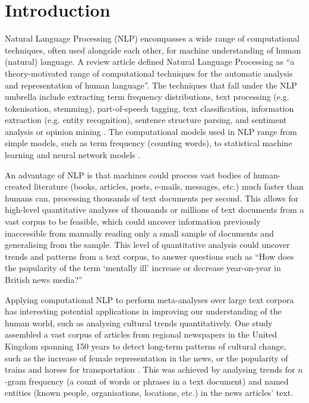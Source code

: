 \documentclass{report}
\begin{document}
\chapter{Introduction} \label{Introduction} %


Natural Language Processing (NLP) encompasses a wide range of computational techniques, often used alongside each other, for machine understanding of human (natural) language.
A review article \cite{cambria2014jumping} defined Natural Language Processing as ``a theory-motivated range of computational techniques for the automatic analysis and representation of human language''.
The techniques that fall under the NLP umbrella include extracting term frequency distributions, text processing (e.g. tokenisation, stemming), part-of-speech tagging, text classification, information extraction (e.g. entity recognition), sentence structure parsing, and sentiment analysis or opinion mining \cite{Nltk, liu2012sentiment}.
The computational models used in NLP range from simple models, such as term frequency (counting words), to statistical machine learning and neural network models \cite{awesome-sentiment-analysis}. 

An advantage of NLP is that machines could process vast bodies of human-created literature (books, articles, posts, e-mails, messages, etc.) much faster than humans can, processing thousands of text documents per second. 
This allows for high-level quantitative analyses of thousands or millions of text documents from a vast corpus to be feasible, which could uncover information previously inaccessible from manually reading only a small sample of documents and generalising from the sample.
This level of quantitative analysis could uncover trends and patterns from a text corpus, to answer questions such as ``How does the popularity of the term `mentally ill' increase or decrease year-on-year in British news media?'' 

Applying computational NLP to perform meta-analyses over large text corpora has interesting potential applications in improving our understanding of the human world, such as analysing cultural trends quantitatively.
One study assembled a vast corpus of articles from regional newspapers in the United Kingdom spanning 150 years to detect long-term patterns of cultural change, such as the increase of female representation in the news, or the popularity of trains and horses for transportation \cite{lansdall2017content}. 
This was achieved by analysing trends for $n$-gram frequency (a count of words or phrases in a text document) and named entities (known people, organisations, locations, etc.) in the news articles' text.
\end{document}
